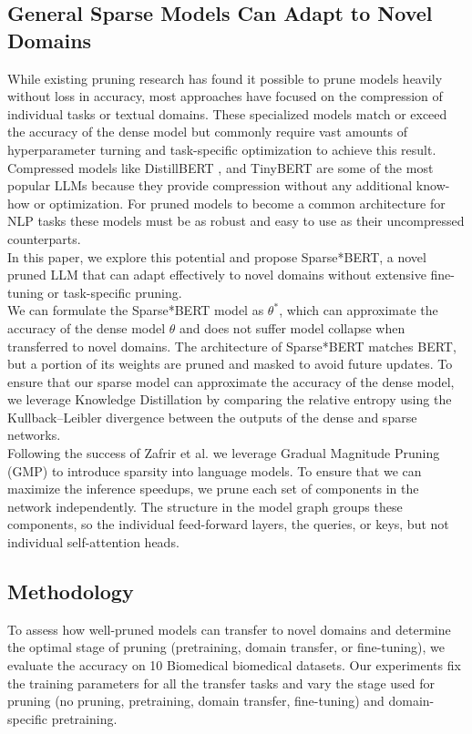 \subsection{General Sparse Models Can Adapt to Novel Domains}
While existing pruning research has found it possible to prune models heavily without loss in accuracy, most approaches have focused on the compression of individual tasks or textual domains. These specialized models match or exceed the accuracy of the dense model but commonly require vast amounts of hyperparameter turning and task-specific optimization to achieve this result. Compressed models like DistillBERT \cite{Sanh2019DistilBERTAD}, and TinyBERT \cite{Jiao2020TinyBERTDB} are some of the most popular LLMs because they provide compression without any additional know-how or optimization. For pruned models to become a common architecture for NLP tasks these models must be as robust and easy to use as their uncompressed counterparts. \\
In this paper, we explore this potential and propose 
Sparse*BERT, a novel pruned LLM that can adapt effectively to novel domains without extensive fine-tuning or task-specific pruning.\\
We can formulate the Sparse*BERT model as $\theta^*$, which can approximate the accuracy of the dense model $\theta$ and does not suffer model collapse when transferred to novel domains. The architecture of Sparse*BERT matches BERT, but a portion of its weights are pruned and masked to avoid future updates. To ensure that our sparse model can approximate the accuracy of the dense model, we leverage Knowledge Distillation by comparing the relative entropy using the Kullback–Leibler divergence between the outputs of the dense and sparse networks.   \\
Following the success of Zafrir et al. \cite{Zafrir2021PruneOF} we leverage Gradual Magnitude Pruning (GMP) to introduce sparsity into language models. To ensure that we can maximize the inference speedups, we prune each set of components in the network independently. The structure in the model graph groups these components, so the individual feed-forward layers, the queries, or keys, but not individual self-attention heads. 
\subsection{Methodology}
To assess how well-pruned models can transfer to novel domains and determine the optimal stage of pruning (pretraining, domain transfer, or fine-tuning), we evaluate the accuracy on 10 Biomedical biomedical datasets. Our experiments fix the training parameters for all the transfer tasks and vary the stage used for pruning (no pruning, pretraining, domain transfer, fine-tuning) and domain-specific pretraining.
